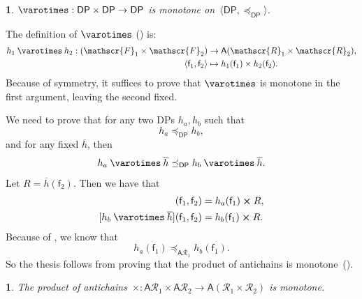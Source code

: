 \documentclass[twocolumn,english]{IEEEconf}
\theoremstyle{plain}
\theoremstyle{definition}
\theoremstyle{definition}
\theoremstyle{plain}
\newtheorem{lem}[thm]{\protect\lemmaname}
\newcommand{\aword}[1]{\mathsf{#1}}
\newcommand{\vmath}[1]{\aword{#1}}
\newcommand{\posleq}{\preceq}
\newcommand{\antichains}{\vmath{A}}
\newcommand{\ftor}{{h}}
\newcommand{\funsp}{\mathscr{F}}
\newcommand{\fun}{\vmath{f}}
\newcommand{\ressp}{\mathscr{R}}
\newcommand{\dpsp}{\vmath{DP}}
\newcommand{\dpleq}{\posleq_\dpsp}
\newcommand{\acprod}{\mathbin{\boldsymbol{\times}}}
\newcommand{\oppar}{\mathbin{\varotimes}}
\providecommand{\lemmaname}{Lemma}
\begin{document}
\begin{lem}
\label{lem:par-monotone}$\oppar:\dpsp\times\dpsp\rightarrow\dpsp$
is monotone on~$\langle\dpsp,\dpleq\rangle$.
\end{lem}
\begin{IEEEproof}
The definition of $\oppar$ () is:
\begin{align*}
\ftor_{1}\oppar\ftor_{2}:(\funsp_{1}\times\funsp_{2}) & \rightarrow\antichains(\ressp_{1}\times\ressp_{2}),\\
\left\langle \fun_{1},\fun_{2}\right\rangle  & \mapsto\ftor_{1}(\fun_{1})\times\ftor_{2}(\fun_{2}).
\end{align*}
Because of symmetry, it suffices to prove that $\oppar$ is monotone
in the first argument, leaving the second fixed.

We need to prove that for any two DPs $\ftor_{a},\ftor_{b}$ such
that
\begin{equation}
\ftor_{a}\dpleq\ftor_{b},\label{eq:Ikno}
\end{equation}
and for any fixed $\overline{\ftor}$, then
\[
\ftor_{a}\oppar\overline{\ftor}\dpleq\ftor_{b}\oppar\overline{\ftor}.
\]
Let $R=\overline{\ftor}(\fun_{2})$. Then we have that
\begin{align*}
[\ftor_{a}\oppar\overline{\ftor}](\fun_{1},\fun_{2}) & =\ftor_{a}(\fun_{1})\acprod R,\\{}
[\ftor_{b}\oppar\overline{\ftor}](\fun_{1},\fun_{2}) & =\ftor_{b}(\fun_{1})\acprod R.
\end{align*}
Because of , we know that 
\[
\ftor_{a}(\fun_{1})\posleq_{\antichains\ressp_{1}}\ftor_{b}(\fun_{1}).
\]
So the thesis follows from proving that the product of antichains
is monotone~().
\end{IEEEproof}
\begin{lem}
\label{lem:product-monotone}The product of antichains~$\acprod:\antichains\ressp_{1}\times\antichains\ressp_{2}\rightarrow\antichains(\ressp_{1}\times\ressp_{2})$
is monotone.
\end{lem}
\end{document}
